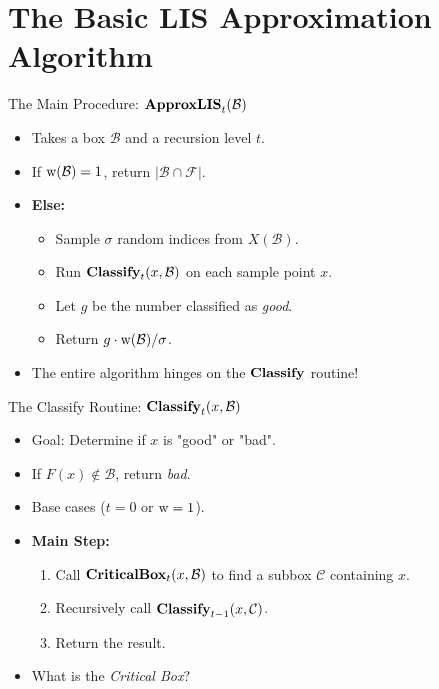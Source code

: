 \documentclass[11pt,aspectratio=169]{beamer}
\newcommand{\width}{{\bf {\rm  w}}}
\newcommand{\classify}{{\rm {\bf Classify}}}
\newcommand{\approxlis}{{\rm {\bf ApproxLIS}}}
\newcommand{\critbox}{{\rm {\bf CriticalBox}}}
\begin{document}
\section{The Basic LIS Approximation Algorithm}

\begin{frame}{The Main Procedure: $\approxlis_t(\mathcal{B})$}
    \begin{itemize}
        \item Takes a box $\mathcal{B}$ and a recursion level $t$.
        \item If $\width(\mathcal{B}) = 1$, return $|\mathcal{B} \cap \mathcal{F}|$.
        \item \textbf{Else:}
        \begin{itemize}
            \item Sample $\sigma$ random indices from $X(\mathcal{B})$.
            \item Run $\classify_t(x, \mathcal{B})$ on each sample point $x$.
            \item Let $g$ be the number classified as \emph{good}.
            \item Return $g \cdot \width(\mathcal{B}) / \sigma$.
        \end{itemize}
        \item The entire algorithm hinges on the $\classify$ routine!
    \end{itemize}
\end{frame}

\begin{frame}{The Classify Routine: $\classify_t(x, \mathcal{B})$}
    \begin{itemize}
        \item Goal: Determine if $x$ is "good" or "bad".
        \item If $F(x) \notin \mathcal{B}$, return \emph{bad}.
        \item Base cases ($t=0$ or $\width=1$).
        \item \textbf{Main Step:}
        \begin{enumerate}
            \item Call $\critbox_t(x, \mathcal{B})$ to find a subbox $\mathcal{C}$ containing $x$.
            \item Recursively call $\classify_{t-1}(x, \mathcal{C})$.
            \item Return the result.
        \end{enumerate}
        \item What is the \emph{Critical Box}?
    \end{itemize}
\end{frame}
\end{document}
